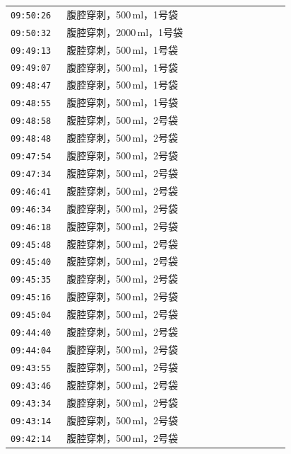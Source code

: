 \documentclass[UTF8,10pt,a4paper,fontset=fandol]{ctexart}
\begin{document}
\small
\begin{tabular}{p{0.18\linewidth}p{0.72\linewidth}}
\texttt{09:50:26} & 腹腔穿刺，500\,ml，1号袋 \\
\texttt{09:50:32} & 腹腔穿刺，2000\,ml，1号袋 \\
\texttt{09:49:13} & 腹腔穿刺，500\,ml，1号袋 \\
\texttt{09:49:07} & 腹腔穿刺，500\,ml，1号袋 \\
\texttt{09:48:47} & 腹腔穿刺，500\,ml，1号袋 \\
\texttt{09:48:55} & 腹腔穿刺，500\,ml，1号袋 \\
\texttt{09:48:58} & 腹腔穿刺，500\,ml，2号袋 \\
\texttt{09:48:48} & 腹腔穿刺，500\,ml，2号袋 \\
\texttt{09:47:54} & 腹腔穿刺，500\,ml，2号袋 \\
\texttt{09:47:34} & 腹腔穿刺，500\,ml，2号袋 \\
\texttt{09:46:41} & 腹腔穿刺，500\,ml，2号袋 \\
\texttt{09:46:34} & 腹腔穿刺，500\,ml，2号袋 \\
\texttt{09:46:18} & 腹腔穿刺，500\,ml，2号袋 \\
\texttt{09:45:48} & 腹腔穿刺，500\,ml，2号袋 \\
\texttt{09:45:40} & 腹腔穿刺，500\,ml，2号袋 \\
\texttt{09:45:35} & 腹腔穿刺，500\,ml，2号袋 \\
\texttt{09:45:16} & 腹腔穿刺，500\,ml，2号袋 \\
\texttt{09:45:04} & 腹腔穿刺，500\,ml，2号袋 \\
\texttt{09:44:40} & 腹腔穿刺，500\,ml，2号袋 \\
\texttt{09:44:04} & 腹腔穿刺，500\,ml，2号袋 \\
\texttt{09:43:55} & 腹腔穿刺，500\,ml，2号袋 \\
\texttt{09:43:46} & 腹腔穿刺，500\,ml，2号袋 \\
\texttt{09:43:34} & 腹腔穿刺，500\,ml，2号袋 \\
\texttt{09:43:14} & 腹腔穿刺，500\,ml，2号袋 \\
\texttt{09:42:14} & 腹腔穿刺，500\,ml，2号袋 \\
\end{tabular}

\vspace{1em}
\end{document}
